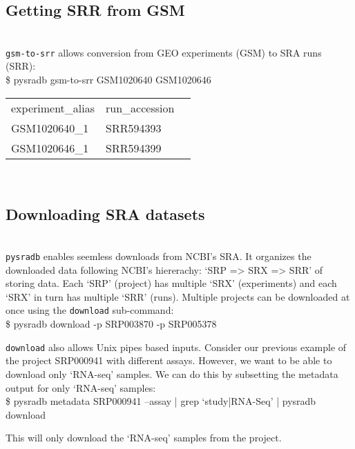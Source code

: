 \documentclass[9pt,a4paper]{extarticle}
\newenvironment{allintypewriter}{\ttfamily}{\par}
\begin{document}
\subsection*{Getting SRR from GSM}
~\\
\texttt{gsm-to-srr} allows conversion from GEO experiments (GSM) to
SRA runs (SRR):\\

\begin{allintypewriter}
\$ pysradb gsm-to-srr  GSM1020640 GSM1020646
\begin{table}[H]
    \begin{tabular}{lll}
experiment_alias & run_accession\\
GSM1020640_1 & SRR594393\\
GSM1020646_1 & SRR594399
\end{tabular}
\end{table}
\end{allintypewriter}
~\\
\subsection*{Downloading SRA datasets}
~\\
\texttt{pysradb} enables seemless downloads from NCBI's SRA. It organizes
the downloaded data following NCBI's hiererachy: `SRP => SRX => SRR' of storing data.
Each `SRP' (project) has multiple `SRX' (experiments) and each `SRX' in turn 
has multiple `SRR' (runs).  Multiple projects can be downloaded at once using
the \texttt{download} sub-command:\\

\begin{allintypewriter}
\$  pysradb download -p SRP003870 -p SRP005378\\
\end{allintypewriter}

\texttt{download} also allows Unix pipes based inputs. Consider our previous
example of the project SRP000941 with different assays. However, we want to be able
to download only `RNA-seq' samples. We can do this by subsetting the metadata
output for only `RNA-seq' samples:\\

\begin{allintypewriter}
\$ pysradb metadata SRP000941 --assay | grep `study|RNA-Seq' | pysradb download\\
\end{allintypewriter}
This will only download the `RNA-seq' samples from the project.
~\\
\end{document}
